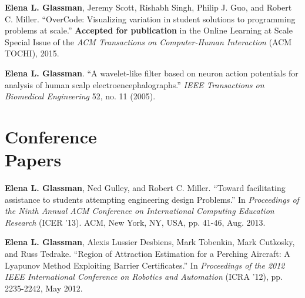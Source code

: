 \documentclass[margin]{res}
\begin{document}
\begin{resume}
{\bf Elena L. Glassman}, Jeremy Scott, Rishabh Singh, Philip J. Guo, and Robert C. Miller. ``OverCode: Visualizing variation in student solutions to programming problems at scale.'' {\bf Accepted for publication} in the Online Learning at Scale Special Issue of the {\it ACM Transactions on Computer-Human Interaction} (ACM TOCHI), 2015.

{\bf Elena L. Glassman}. ``A wavelet-like filter based on neuron action potentials for analysis of human scalp electroencephalographs.'' \textit{IEEE Transactions on Biomedical Engineering} 52, no. 11 (2005).

\section{Conference\\ Papers}

{\bf Elena L. Glassman}, Ned Gulley, and Robert C. Miller. ``Toward facilitating assistance to students attempting engineering design Problems.'' In {\it Proceedings of the Ninth Annual ACM Conference on International Computing Education Research} (ICER '13). ACM, New York, NY, USA, pp. 41-46, Aug. 2013.




{\bf Elena L. Glassman}, Alexis Lussier Desbiens, Mark Tobenkin, Mark Cutkosky, and Russ Tedrake. ``Region of Attraction Estimation for a Perching Aircraft: A Lyapunov Method Exploiting Barrier Certificates.'' In {\it Proceedings of the 2012 IEEE International Conference on Robotics and Automation} (ICRA '12), pp. 2235-2242, May 2012.



\end{resume}
\end{document}
